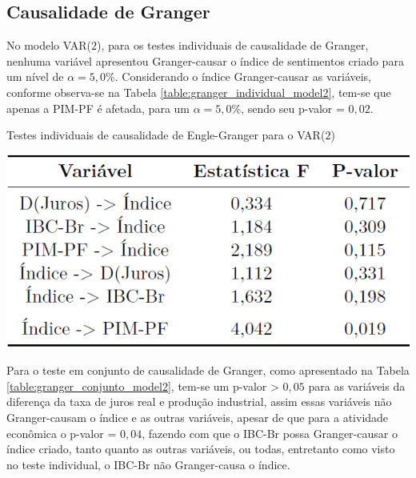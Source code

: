 \subsection{Causalidade de Granger}


No modelo VAR($2$), para os testes individuais de causalidade de Granger, nenhuma variável apresentou Granger-causar o índice de sentimentos criado para um nível de $\alpha = 5,0\%$. Considerando o índice Granger-causar as variáveis, conforme observa-se na Tabela \ref{table:granger_individual_model2}, tem-se que apenas a PIM-PF é afetada, para um $\alpha = 5,0\%$, sendo seu p-valor = $0,02$.

\begin{table}[hbtp]
	\centering
	\caption{Testes individuais de causalidade de Engle-Granger para o VAR($2$)} \label{table:granger_individual_model2}
	\includegraphics[scale = 0.45]{figuras/granger_individual_model2.PNG}
\end{table}

Para o teste em conjunto de causalidade de Granger, como apresentado na Tabela \ref{table:granger_conjunto_model2}, tem-se um p-valor > $0,05$ para as variáveis da diferença da taxa de juros real e produção industrial, assim essas variáveis não Granger-causam o índice e as outras variáveis, apesar de que para a atividade econômica o p-valor = $0,04$, fazendo com que o IBC-Br possa Granger-causar o índice criado, tanto quanto as outras variáveis, ou todas, entretanto como visto no teste individual, o IBC-Br não Granger-causa o índice.

